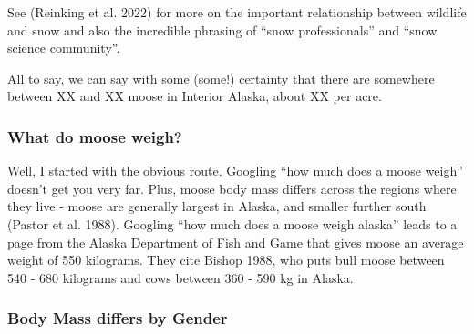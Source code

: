 \documentclass[
  letterpaper,
  DIV=11,
  numbers=noendperiod,
  oneside]{scrartcl}
\begin{document}
See (Reinking et al.
2022)
for more on the important relationship between wildlife and snow and
also the incredible phrasing of ``snow professionals'' and ``snow
science community''.

All to say, we can say with some (some!) certainty that there are
somewhere between XX and XX moose in Interior Alaska, about XX per acre.

\hypertarget{what-do-moose-weigh}{%
\subsubsection{What do moose weigh?}\label{what-do-moose-weigh}}

Well, I started with the obvious route. Googling ``how much does a moose
weigh'' doesn't get you very far. Plus, moose body mass differs across
the regions where they live - moose are generally largest in Alaska, and
smaller further south (Pastor et al.
1988).
Googling ``how much does a moose weigh alaska'' leads to a page from the
Alaska Department of Fish and Game that gives moose an average weight of
550 kilograms. They cite Bishop 1988, who puts bull moose between 540 -
680 kilograms and cows between 360 - 590 kg in Alaska.

\hypertarget{body-mass-differs-by-gender}{%
\subsubsection{Body Mass differs by
Gender}\label{body-mass-differs-by-gender}}
\end{document}
